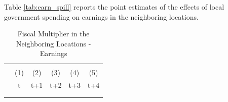 \documentclass[dv_diss_main.tex]{subfiles}
\begin{document}
\newpage 
Table \ref{tab:earn_spill} reports the point estimates of the effects of local government spending on earnings in the neighboring locations.
\begin{table}[H]

    \begin{center}
    \caption{Fiscal Multiplier in the Neighboring Locations - Earnings}
    \begin{tabular}{lccccc} \hline
    \vspace{-2pt} & \vspace{-2pt} & \vspace{-2pt} & \vspace{-2pt} & \vspace{-2pt} \\
     & (1) & (2) & (3) & (4) & (5) \\
     & t & t+1 & t+2 & t+3 & t+4 \\ 
     
    \vspace{-2pt} & \vspace{-2pt} & \vspace{-2pt} & \vspace{-2pt} & \vspace{-2pt} \\\hline
    \vspace{-1.5pt} & \vspace{-1.5pt} & \vspace{-1.5pt} & \vspace{-1.5pt} & \vspace{-1.5pt} \\


\end{tabular}
\end{center}
\end{table}
\end{document}
